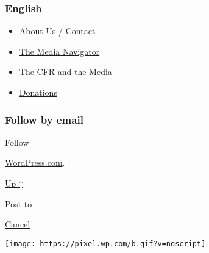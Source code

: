 \hypertarget{english}{%
\subsubsection{English}\label{english}}

\begin{itemize}
\tightlist
\item
  \href{https://swprs.org/contact/}{About Us / Contact}
\item
  \href{https://swprs.org/media-navigator/}{The Media Navigator}
\item
  \href{https://swprs.org/the-american-empire-and-its-media/}{The CFR
  and the Media}
\item
  \href{https://swprs.org/donations/}{Donations}
\end{itemize}

\hypertarget{follow-by-email}{%
\subsubsection{Follow by email}\label{follow-by-email}}

Follow

\href{https://wordpress.com/?ref=footer_custom_com}{WordPress.com}.

\protect\hyperlink{}{Up ↑}

Post to

\protect\hyperlink{}{Cancel}

\texttt{[image: https://pixel.wp.com/b.gif?v=noscript]}
